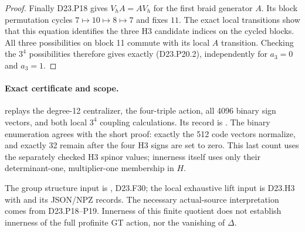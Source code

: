 \begin{proof}
Finally D23.P18 gives $V_hA=AV_h$ for the first braid
generator $A$. Its block permutation cycles
$7\mapsto10\mapsto8\mapsto7$ and fixes $11$.
The exact local transitions show that this equation
identifies the three H3 candidate indices on the cycled
blocks. All three possibilities on block 11 commute with
its local $A$ transition. Checking the $3^4$ possibilities
therefore gives exactly (D23.P20.2), independently for
$a_3=0$ and $a_3=1$.
\end{proof}

\paragraph{Exact certificate and scope.}
 replays the degree-12
centralizer, the four-triple action, all 4096 binary sign
vectors, and both local $3^4$ coupling calculations. Its
record is . The binary
enumeration agrees with the short proof: exactly the 512
code vectors normalize, and exactly 32 remain after the
four H3 signs are set to zero. This last count uses the
separately checked H3 spinor values; innerness itself uses
only their determinant-one, multiplier-one membership in
$H$.

The group structure input is
, D23.F30;
the local exhaustive lift input is D23.H3 with
 and its
JSON/NPZ records. The necessary actual-source interpretation
comes from D23.P18--P19. Innerness of this finite quotient
does not establish innerness of the full profinite GT
action, nor the vanishing of $\Delta$.
